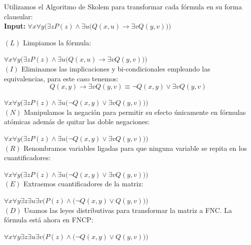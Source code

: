 \documentclass[12pt,letterpaper]{article}
\newcommand{\imp}{\rightarrow}
\begin{document}
\begin{enumerate}

  Utilizamos el Algoritmo de Skolem para transformar cada f\'{o}rmula en su forma clausular:\\
  
  \textbf{Input:} \( \forall x \forall y \Big(\exists z P(z) \wedge \exists u \big(Q(x,u) \rightarrow \exists v Q(y,v)\big)\Big) \)

  $(L)$ Limpiamos la f\'{o}rmula: \checkmark

  \quad {} $\forall x \forall y \Big(\exists z P(z) \wedge \exists u \big(Q(x,u) \rightarrow \exists v Q(y,v)\big)\Big)$
  \\
  
  $(I)$ Eliminamos las implicaciones y bi-condicionales empleando las equivalencias, para este caso tenemos:
  \[
    Q(x, y) \imp \exists v Q(y, v) \equiv \neg Q(x, y) \lor \exists v Q(y, v)
  \]

  \quad {} $\forall x \forall y \Big(\exists z P(z) \wedge \exists u \big(\neg Q(x, y) \lor \exists v Q(y, v)\big)\Big)$
  \\

  $(N)$ Manipulamos la negaci\'{o}n para permitir su efecto \'{u}nicamente en f\'{o}rmulas at\'{o}micas adem\'{a}s de quitar las doble negaciones: \checkmark

  \quad {} $\forall x \forall y \Big(\exists z P(z) \wedge \exists u \big(\neg Q(x, y) \lor \exists v Q(y, v)\big)\Big)$
  \\
  
  $(R)$ Renombramos variables ligadas para que ninguna variable se repita en los cuantificadores: \checkmark

  \quad {} $\forall x \forall y \Big(\exists z P(z) \wedge \exists u \big(\neg Q(x, y) \lor \exists v Q(y, v)\big)\Big)$
  \\

  $(E)$ Extraemos cuantificadores de la matriz:

  \quad {} $\forall x \forall y \exists z \exists u \exists v \Big(P(z) \wedge \big(\neg Q(x, y) \lor Q(y, v)\big)\Big)$
  \\

  $(D)$ Usamos las leyes distributivas para transformar la matriz a FNC. La f\'{o}rmula est\'{a} ahora en FNCP: \checkmark

  \quad {} $\forall x \forall y \exists z \exists u \exists v \Big(P(z) \wedge \big(\neg Q(x, y) \lor Q(y, v)\big)\Big)$
  \\
  

\end{enumerate}
\end{document}
